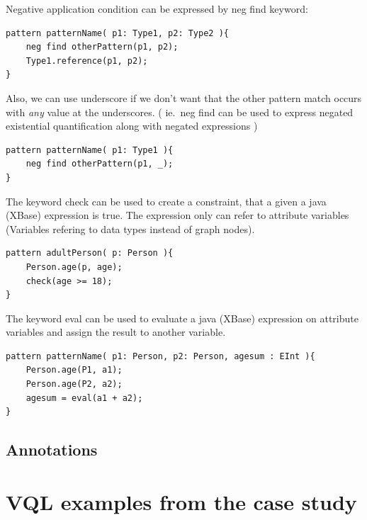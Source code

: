 \begin{minipage}{\textwidth}
Negative application condition can be expressed by neg find keyword:
\begin{lstlisting}[language=vql]
pattern patternName( p1: Type1, p2: Type2 ){
	neg find otherPattern(p1, p2);
	Type1.reference(p1, p2);
}
\end{lstlisting}

Also, we can use underscore if we don't want that the other pattern match occurs with \emph{any} value at the underscores. ( ie.\ neg find can be used to express negated existential quantification along with negated expressions )

\begin{lstlisting}[language=vql]
pattern patternName( p1: Type1 ){
	neg find otherPattern(p1, _);
}
\end{lstlisting}
\end{minipage}
\vspace{\belowdisplayskip}


\begin{minipage}{\textwidth}
The keyword check can be used to create a constraint, that a given a java (XBase) expression is true. The expression only can refer to attribute  variables (Variables refering to data types instead of graph nodes).
\begin{lstlisting}[language=vql]
pattern adultPerson( p: Person ){
	Person.age(p, age);
	check(age >= 18);
}
\end{lstlisting}
\end{minipage}
\vspace{\belowdisplayskip}

\begin{minipage}{\textwidth}
The keyword eval can be used to evaluate a java (XBase) expression on attribute variables and assign the result to another variable.
\begin{lstlisting}[language=vql]
pattern patternName( p1: Person, p2: Person, agesum : EInt ){
	Person.age(P1, a1);
	Person.age(P2, a2);
	agesum = eval(a1 + a2);
}
\end{lstlisting}
\end{minipage}
\vspace{\belowdisplayskip}




\subsection{Annotations}


\section{VQL examples from the case study}



